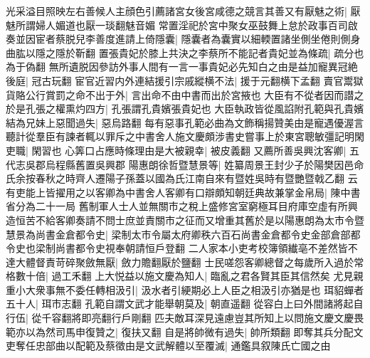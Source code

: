 光采溢目照映左右善候人主顔色引薦諸宮女後宮咸德之競言其善又有厭魅之術|{
	厭魅所謂婦人媚道也厭一琰翻魅音媚}
常置淫祀於宮中聚女巫鼓舞上怠於政事百司啟奏並因宦者蔡脱兒李善度進請上倚隱囊|{
	隱囊者為囊實以細輭置諸坐側坐倦則側身曲肱以隱之隱於靳翻}
置張貴妃於膝上共決之李蔡所不能記者貴妃並為條疏|{
	疏分也為于偽翻}
無所遺脱因參訪外事人間有一言一事貴妃必先知白之由是益加寵異冠絶後庭|{
	冠古玩翻}
宦官近習内外連結援引宗戚縱横不法|{
	援于元翻横下孟翻}
賣官鬻獄貨賂公行賞罰之命不出于外|{
	言出命不由中書而出於宮掖也}
大臣有不從者因而譛之於是孔張之權熏灼四方|{
	孔張謂孔貴嬪張貴妃也}
大臣執政皆從風諂附孔範與孔貴嬪結為兄妹上惡聞過失|{
	惡烏路翻}
每有惡事孔範必曲為文飾稱揚贊美由是寵遇優渥言聽計從羣臣有諫者輒以罪斥之中書舍人施文慶頗涉書史嘗事上於東宮聰敏彊記明閑吏職|{
	閑習也}
心筭口占應時條理由是大被親幸|{
	被皮義翻}
又薦所善吳興沈客卿|{
	五代志吳郡烏程縣舊置吳興郡}
陽惠朗徐哲暨慧景等|{
	姓纂周景王封少子於陽樊因邑命氏余按春秋之時齊人遷陽子孫蓋以國為氏江南自來有暨姓吳時有暨艷暨戟乙翻}
云有吏能上皆擢用之以客卿為中書舍人客卿有口辯頗知朝廷典故兼掌金帛局|{
	陳中書省分為二十一局}
舊制軍人士人並無關市之稅上盛修宮室窮極耳目府庫空虛有所興造恒苦不給客卿奏請不問士庶並責關市之征而又增重其舊於是以陽惠朗為太市令暨慧景為尚書金倉都令史|{
	梁制太市令屬太府卿秩六百石尚書金倉都令史金部倉部都令史也梁制尚書都令史視奉朝請恒戶登翻}
二人家本小吏考校簿領纎亳不差然皆不達大體督責苛碎聚斂無厭|{
	斂力贍翻厭於鹽翻}
士民嗟怨客卿總督之每歲所入過於常格數十倍|{
	過工禾翻}
上大悦益以施文慶為知人|{
	臨亂之君各賢其臣其信然矣}
尤見親重小大衆事無不委任轉相汲引|{
	汲水者引綆期必上人臣之相汲引亦猶是也}
珥貂蟬者五十人|{
	珥市志翻}
孔範自謂文武才能舉朝莫及|{
	朝直遥翻}
從容白上曰外間諸將起自行伍|{
	從千容翻將即亮翻行戶剛翻}
匹夫敵耳深見遠慮豈其所知上以問施文慶文慶畏範亦以為然司馬申復贊之|{
	復扶又翻}
自是將帥微有過失|{
	帥所類翻}
即奪其兵分配文吏奪任忠部曲以配範及蔡徵由是文武解體以至覆滅|{
	通鑑具叙陳氏亡國之由}


